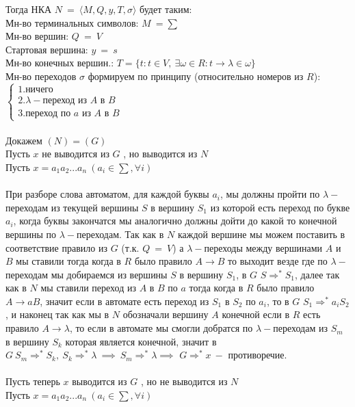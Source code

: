 \documentclass[10pt]{article}
\begin{document}
{\begin{enumerate}
		Тогда НКА $N\ =\ \langle M,Q,y,T,\sigma\rangle$ будет таким:\\
		Мн-во терминальных символов: $M\ = \sum$\\
		Мн-во вершин: $Q\ =\ V$\\
		Стартовая вершина: $y\ =\ s$\\
		Мн-во конечных вершин.: $T=\{t:t\in V,\ \exists\omega\in R: t\rightarrow\lambda\in\omega\}$ \\
		Мн-во переходов $\sigma$ формируем по принципу (относительно номеров из $R$): $\begin{cases}1.\text{ничего}\\ 2.\lambda-\text{переход из }A \text{ в } B\\ 3.\text{переход по } a \text{ из }A \text{ в }B \end{cases}$\\\\
		Докажем $(N)=(G)$\\
		Пусть $x$ не выводится из $G$ , но выводится из $N$\\
		Пусть $x=a_1a_2...a_n\ (a_i \in \sum, \forall i)$\\\\
		При разборе слова автоматом, для каждой буквы $a_i$, мы должны пройти по $\lambda-$переходам из текущей вершины $S$ в вершину $S_1$ из которой есть переход по букве $a_i$, когда буквы закончатся мы аналогично должны дойти до какой то конечной вершины по $\lambda-$переходам.
		Так как в $N$ каждой вершине мы можем поставить в соответствие правило из $G$ (т.к. $Q\ =\ V$) а $\lambda-$переходы между вершинами $A$ и $B$ мы ставили тогда когда в $R$ было правило $A\rightarrow B$ то 
		выходит везде где по $\lambda-$переходам мы добираемся из вершины $S$ в вершину $S_1$, в $G$ $S\Rightarrow^* S_1$, далее так как в $N$ мы ставили переход из $A$ в $B$ по $a$ тогда когда в $R$ было правило $A\rightarrow aB$, значит если в автомате есть переход из $S_1$ в $S_2$ по $a_i$, то в $G$ $S_1\Rightarrow^* a_iS_2$, и наконец так как мы в $N$ обозначали вершину $A$ конечной если в $R$ есть правило $A\rightarrow\lambda$, то если в автомате мы смогли добратся по $\lambda-$переходам из $S_m$ в вершину $S_k$ которая является конечной, значит в $G\ S_m\Rightarrow^* S_k,\ S_k\Rightarrow^* \lambda\ \implies\ S_m\Rightarrow^* \lambda \implies$ $G\Rightarrow^*x\ -$ противоречие.\\\\
		Пусть теперь $x$ выводится из $G$ , но не выводится из $N$\\
		Пусть $x=a_1a_2...a_n\ (a_i \in \sum, \forall i)$\\\\

\end{enumerate}}
\end{document}
